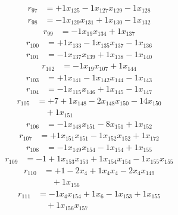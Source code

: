 \[\begin{aligned}
r_{97} &= + 1 x_{125} - 1 x_{127} x_{129} - 1 x_{128}
\end{aligned}\]
\[\begin{aligned}
r_{98} &= - 1 x_{129} x_{131} + 1 x_{130} - 1 x_{132}
\end{aligned}\]
\[\begin{aligned}
r_{99} &= - 1 x_{19} x_{134} + 1 x_{137}
\end{aligned}\]
\[\begin{aligned}
r_{100} &= + 1 x_{133} - 1 x_{135} x_{137} - 1 x_{136}
\end{aligned}\]
\[\begin{aligned}
r_{101} &= - 1 x_{137} x_{139} + 1 x_{138} - 1 x_{140}
\end{aligned}\]
\[\begin{aligned}
r_{102} &= - 1 x_{19} x_{107} + 1 x_{144}
\end{aligned}\]
\[\begin{aligned}
r_{103} &= + 1 x_{141} - 1 x_{142} x_{144} - 1 x_{143}
\end{aligned}\]
\[\begin{aligned}
r_{104} &= - 1 x_{115} x_{146} + 1 x_{145} - 1 x_{147}
\end{aligned}\]
\[\begin{aligned}
r_{105} &= + 7 + 1 x_{148} - 2 x_{148} x_{150} - 14 x_{150} \\
 &\quad + 1 x_{151}
\end{aligned}\]
\[\begin{aligned}
r_{106} &= - 1 x_{148} x_{151} - 8 x_{151} + 1 x_{152}
\end{aligned}\]
\[\begin{aligned}
r_{107} &= + 1 x_{151} x_{151} - 1 x_{152} x_{152} + 1 x_{172}
\end{aligned}\]
\[\begin{aligned}
r_{108} &= - 1 x_{149} x_{154} - 1 x_{154} + 1 x_{155}
\end{aligned}\]
\[\begin{aligned}
r_{109} &= - 1 + 1 x_{153} x_{153} + 1 x_{154} x_{154} - 1 x_{155} x_{155}
\end{aligned}\]
\[\begin{aligned}
r_{110} &= + 1 - 2 x_{4} + 1 x_{4} x_{4} - 2 x_{4} x_{149} \\
 &\quad + 1 x_{156}
\end{aligned}\]
\[\begin{aligned}
r_{111} &= - 1 x_{4} x_{154} + 1 x_{6} - 1 x_{153} + 1 x_{155} \\
 &\quad + 1 x_{156} x_{157}
\end{aligned}\]
